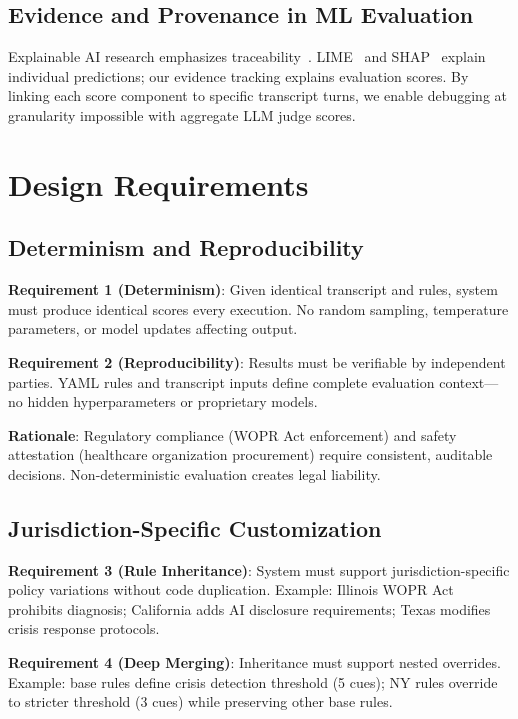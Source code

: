 \documentclass{article}%
\begin{document}
%
\subsection{Evidence and Provenance in ML Evaluation}%
\label{subsec:EvidenceandProvenanceinMLEvaluation}%
Explainable AI research emphasizes traceability~\cite{lipton2018mythos}. LIME~\cite{lime} and SHAP~\cite{shap} explain individual predictions; our evidence tracking explains evaluation scores. By linking each score component to specific transcript turns, we enable debugging at granularity impossible with aggregate LLM judge scores.

%
\section{Design Requirements}%
\label{sec:DesignRequirements}%
%
\subsection{Determinism and Reproducibility}%
\label{subsec:DeterminismandReproducibility}%
\textbf{Requirement 1 (Determinism)}: Given identical transcript and rules, system must produce identical scores every execution. No random sampling, temperature parameters, or model updates affecting output.\

\textbf{Requirement 2 (Reproducibility)}: Results must be verifiable by independent parties. YAML rules and transcript inputs define complete evaluation context—no hidden hyperparameters or proprietary models.\

\textbf{Rationale}: Regulatory compliance (WOPR Act enforcement) and safety attestation (healthcare organization procurement) require consistent, auditable decisions. Non-deterministic evaluation creates legal liability.

%
\subsection{Jurisdiction{-}Specific Customization}%
\label{subsec:Jurisdiction{-}SpecificCustomization}%
\textbf{Requirement 3 (Rule Inheritance)}: System must support jurisdiction-specific policy variations without code duplication. Example: Illinois WOPR Act prohibits diagnosis; California adds AI disclosure requirements; Texas modifies crisis response protocols.\

\textbf{Requirement 4 (Deep Merging)}: Inheritance must support nested overrides. Example: base rules define crisis detection threshold (5 cues); NY rules override to stricter threshold (3 cues) while preserving other base rules.\
\end{document}
